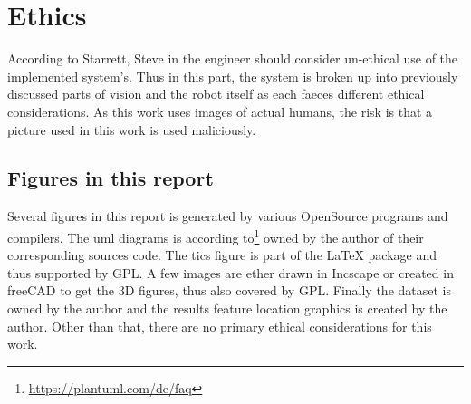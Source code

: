 \section{Ethics}
\label{sec:ethics}


According to Starrett, Steve in \cite{starrett2017engineering} the engineer should consider un-ethical use of the implemented system's.
Thus in this part, the system is broken up into previously discussed parts of vision and the robot itself as each faeces different ethical considerations.
As this work uses images of actual humans, the risk is that a picture used in this work is used maliciously.

\subsection{Figures in this report}%
\label{sub:Figures_in_this_report}
Several figures in this report is generated by various OpenSource programs and compilers.
The \ac{uml} diagrams is according to\footnote{\url{https://plantuml.com/de/faq}} owned by the author of their corresponding sources code.
The tics figure is part of the LaTeX package and thus supported by GPL\@.
A few images are ether drawn in Incscape or created in freeCAD to get the 3D figures, thus also covered by GPL\@.
Finally the dataset is owned by the author and the results feature location graphics is created by the author.
Other than that, there are no primary ethical considerations for this work.
